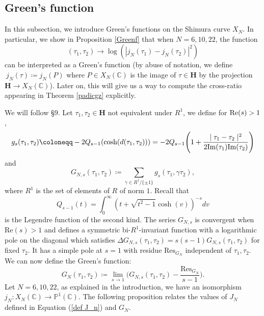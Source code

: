 \documentclass[a4paper,12pt]{article}
\newcommand{\CC}{\mathbb{C}}
\begin{document}
\subsection{Green's function}\label{subsection green function}
In this subsection, we introduce Green’s functions on the Shimura curve $X_N$. In particular, we show in Proposition \ref{Greenf} that when $N=6,10,22$, the function
\[(\tau_1,\tau_2)\rightarrow\log(|j_N(\tau_1)-j_N(\tau_2)|^2)
\]
can be interpreted as a Green's function (by abuse of notation, we define $~j_N(\tau)\coloneqq j_N(P)$ where $P\in X_N(\CC)$ is the image of $\tau\in \mathbf{H}$ by the projection $\mathbf{H}\rightarrow X_N(\CC)$). Later on, this will give us a way to compute the cross-ratio appearing in Theorem \ref{padicgz} explicitly.
\par
We will follow \cite{GrossGreenfunction} \S9. Let $\tau_1,\tau_2\in\mathbf{H}$ not equivalent under $R^1$, we define for $\textup{Re}(s)>1$,
\begin{equation}
g_s(\tau_1,\tau_2)\coloneqq -2Q_{s-1}(\text{cosh}(d(\tau_1,\tau_2)))=-2Q_{s-1}\Biggl(1+\frac{\mid \tau_1-{\tau_2}\mid^2}{2\text{\normalfont{Im}}(\tau_1)\text{\normalfont{Im}}(\tau_2)}\Biggl)
\end{equation}
and 
\begin{equation}\label{eq green function}
G_{N,s}(\tau_1,\tau_2)\coloneqq \sum_{\gamma\in R^1/\{\pm1\}}g_s(\tau_1,\gamma\tau_2),
\end{equation} 
where $R^1$ is the set of elements of $R$ of norm $1$. Recall that \begin{equation}\label{def Legendre function}
Q_{s-1}(t)=\int_{0}^\infty(t+\sqrt{t^2-1}\cosh(v))^{-s}dv
\end{equation}
is the Legendre function of the second kind. The series $G_{N,s}$ is convergent when Re$(s)>1$ and defines a symmetric bi-$R^1$-invariant function with a logarithmic pole on the diagonal which satisfies $\Delta G_{N,s}(\tau_1, \tau_2) = s(s - 1)G_{N,s}(\tau_1, \tau_2)$ for
fixed $\tau_2$. It has a simple pole at $s=1$ with residue $\text{Res}_{G_N}$ independent of $\tau_1,\tau_2$.
We can now define the Green's function:
\begin{equation}
G_N(\tau_1,\tau_2)\coloneqq \lim_{s\rightarrow 1}\Biggl(G_{N,s}(\tau_1,\tau_2)-\frac{\text{Res}_{G_N}}{s-1}\Biggl).
\end{equation}
Let $N=6,10,22$, as explained in the introduction, we have an isomorphism $j_{N}:X_N(\CC)\rightarrow \mathbb{P}^1(\mathbb{C})$. The following proposition relates the values of $J_N$ defined in Equation (\ref{def J_n}) and $G_N$.
\end{document}
